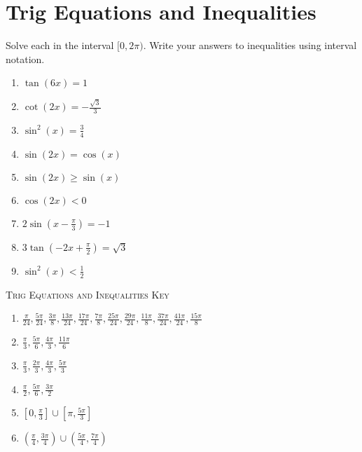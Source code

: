\chapter{Trig Equations and Inequalities}

Solve each in the interval $[0,2\pi)$. Write your answers to inequalities using interval notation.

\begin{enumerate}
	\item $\tan(6x) = 1$
    \item $\cot(2x) = -\frac{\sqrt{3}}{3}$
    \item $\sin^2 (x) = \frac{3}{4}$
    \item $\sin(2x) = \cos(x)$
    \item $\sin(2x) \geq \sin(x)$
    \item $\cos(2x) < 0$
    \item $2\sin\left(x-\frac{\pi}{3}\right) = -1$
    \item $3\tan\left(-2x+\frac{\pi}{2}\right)=\sqrt{3}$
    \item $\sin^2(x) < \frac{1}{2}$
\end{enumerate}

\newpage

\textsc{Trig Equations and Inequalities Key}

\begin{enumerate}
	\item $\frac{\pi}{24}, \frac{5\pi}{24}, \frac{3\pi}{8}, \frac{13\pi}{24}, \frac{17\pi}{24}, \frac{7\pi}{8}, \frac{25\pi}{24}, \frac{29\pi}{24}, \frac{11\pi}{8}, \frac{37\pi}{24}, \frac{41\pi}{24}, \frac{15\pi}{8}$
    
	\item $\frac{\pi}{3}, \frac{5\pi}{6}, \frac{4\pi}{3}, \frac{11\pi}{6}$
    
	\item $\frac{\pi}{3}, \frac{2\pi}{3}, \frac{4\pi}{3}, \frac{5\pi}{3}$
    
	\item $\frac{\pi}{2}, \frac{5\pi}{6}, \frac{3\pi}{2}$
    
	\item $\left[0, \frac{\pi}{3}\right] \cup \left[\pi, \frac{5\pi}{3}\right]$
    
	\item $\left(\frac{\pi}{4}, \frac{3\pi}{4}\right) \cup \left(\frac{5\pi}{4}, \frac{7\pi}{4}\right)$
\end{enumerate}